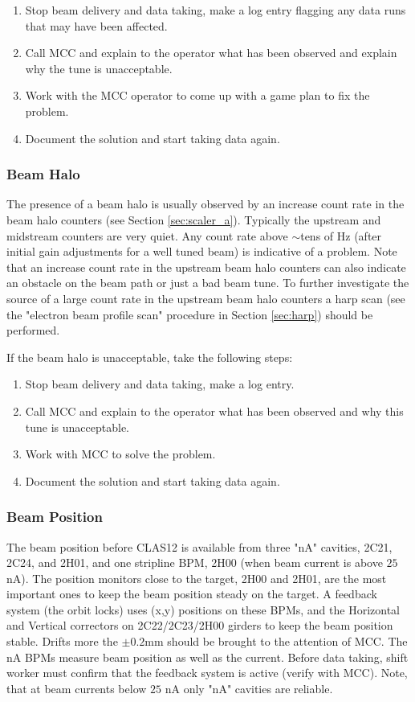 \documentclass[12pt]{article}
\begin{document}
\begin{enumerate}
\item Stop beam delivery and data taking, make a log entry flagging any data runs that may have been
affected.
\item Call MCC and explain to the operator what has been observed and explain why
the tune is unacceptable.
\item Work with the MCC operator to come up with a game plan to fix the problem.
\item Document the solution and start taking data again.
\end{enumerate}


\subsubsection{Beam Halo}
\indent

The presence of a beam halo is usually observed by an increase count rate in
the beam halo counters (see Section \ref{sec:scaler_a}). Typically
the upstream and midstream counters are very quiet. Any count rate above $\sim$tens of Hz (after initial gain adjustments for a well tuned beam) is indicative
of a problem. Note that an increase count rate in the upstream beam halo counters
can also indicate an obstacle on the beam path or just a bad beam tune. To 
further investigate the source of a large count rate in the upstream beam halo
counters a harp scan (see the "electron beam profile scan" procedure in Section \ref{sec:harp}) should be performed. 

If the beam halo is unacceptable, take the following steps:

\begin{enumerate}
\item Stop beam delivery and data taking, make a log entry.
\item Call MCC and explain to the operator what has been observed and why this tune
is unacceptable.
\item Work with MCC to solve the problem.
\item Document the solution and start taking data again.
\end{enumerate}

\subsubsection{Beam Position}
\indent

The beam position before CLAS12 is available from three "nA" cavities, 2C21, 2C24, and 2H01, and one stripline BPM, 2H00 (when beam current is above $25$ nA). The position monitors close to the target, 2H00 and 2H01, are the most important ones to keep the beam position steady on the target. A feedback system (the orbit locks) uses (x,y) positions on these BPMs, and the Horizontal and Vertical correctors on 2C22/2C23/2H00 girders to keep the beam position stable. Drifts more the \( \pm 0.2 \)mm
should be brought to the attention of MCC. The nA BPMs measure beam position as well as the current. Before data taking, shift worker must confirm that the feedback system is active (verify with MCC). Note, that at beam currents below $25$ nA only "nA" cavities are reliable. 
\end{document}
